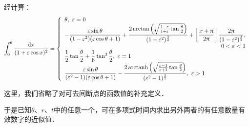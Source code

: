 \documentclass[UTF8,fontset=none,linespread=1.2]{ctexart}
\DeclareMathOperator{\arctanh}{arctanh}
\newcommand{\upd}{\mathrm{d}}
\begin{document}
经计算：$$\int_0^{\theta}\dfrac{\upd x}{(1+\varepsilon\cos x)^2}=\left\lbrace\begin{array}{l}
\theta,\ \varepsilon=0\\
-\dfrac{\varepsilon\sin\theta}{(1-\varepsilon^2)(\varepsilon\cos\theta+1)}+\dfrac{2\arctan\left(\sqrt{\frac{1-\varepsilon}{1+\varepsilon}\tan\frac\theta2}\right)}{(1-\varepsilon^2)^{\frac32}}+\left\lfloor\dfrac{x+\uppi}{2\uppi}\right\rfloor\dfrac{2\uppi}{(1-\varepsilon^2)^{\frac32}},\\
\hspace*{\fill} 0<\varepsilon<1\\
\dfrac12\tan\dfrac\theta2+\dfrac16\tan^3\dfrac\theta2,\ \varepsilon=1\\
\dfrac{\varepsilon\sin\theta}{(\varepsilon^2-1)(\varepsilon\cos\theta+1)}-\dfrac{2\arctanh\left(\sqrt{\frac{\varepsilon-1}{\varepsilon+1}\tan\frac\theta2}\right)}{(\varepsilon^2-1)^{\frac32}},\ \varepsilon>1\\
\end{array}\right.$$

这里，我们省略了对可去间断点的函数值的补充定义．

于是已知$\theta$、$r$、$t$中的任意一个，可在多项式时间内求出另外两者的有任意数量有效数字的近似值．
\end{document}
